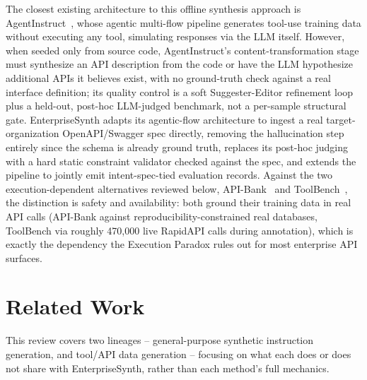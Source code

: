 \documentclass[letterpaper]{article} %
\begin{document}
The closest existing architecture to this offline synthesis approach is
AgentInstruct~\cite{mitra2024agentinstruct}, whose agentic multi-flow pipeline generates tool-use
training data without executing any tool, simulating responses via the LLM itself. However, when
seeded only from source code, AgentInstruct's content-transformation stage must synthesize an API
description from the code or have the LLM hypothesize additional APIs it believes exist, with no
ground-truth check against a real interface definition; its quality control is a soft
Suggester-Editor refinement loop plus a held-out, post-hoc LLM-judged benchmark, not a per-sample
structural gate. EnterpriseSynth adapts its agentic-flow architecture to ingest a real
target-organization OpenAPI/Swagger spec directly, removing the hallucination step entirely since
the schema is already ground truth, replaces its post-hoc judging with a hard static constraint
validator checked against the spec, and extends the pipeline to jointly emit intent-spec-tied
evaluation records. Against the two execution-dependent alternatives reviewed below,
API-Bank~\cite{li2023apibank} and ToolBench~\cite{qin2023toolbench}, the distinction is safety and
availability: both ground their training data in real API calls (API-Bank against
reproducibility-constrained real databases, ToolBench via roughly 470,000 live RapidAPI calls
during annotation), which is exactly the dependency the Execution Paradox rules out for most
enterprise API surfaces.

\section{Related Work}
This review covers two lineages -- general-purpose synthetic instruction generation, and tool/API
data generation -- focusing on what each does or does not share with EnterpriseSynth, rather than
each method's full mechanics.
\end{document}
